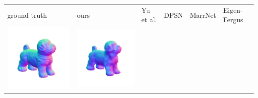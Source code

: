 \begin{tabularx}{\linewidth}{@{}Y@{}Y@{}Y@{}Y@{}Y@{}Y@{}}
ground truth & ours & Yu et al. & DPSN & MarrNet & Eigen-Fergus \\
\includegraphics[width=\linewidth]{semisynthetic/20160617_17_gt.png} &
\includegraphics[width=\linewidth]{semisynthetic/20160617_17_ours_out.png} &

\end{tabularx}
